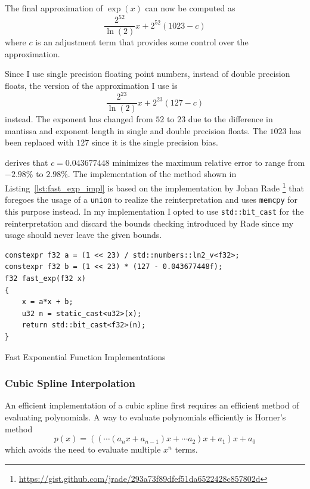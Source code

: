 \documentclass[a4paper, 11pt]{memoir}
\begin{document}
    The final approximation of $\exp{(x)}$ can now be computed as
    \begin{equation}
        \frac{2^{52}}{\ln{(2)}} x + 2^{52}(1023 - c)
    \end{equation}
    where $c$ is an adjustment term that provides some control over the approximation.

    Since I use single precision floating point numbers, instead of double precision floats, the version of the
    approximation I use is
    \begin{equation}
        \frac{2^{23}}{\ln{(2)}}x + 2^{23}(127 - c)
    \end{equation}
    instead. The exponent has changed from $52$ to $23$ due to the difference in mantissa and exponent length in single and
    double precision floats. The $1023$ has been replaced with $127$ since it is the single precision bias.

    \citeauthor{fast_exp} derives that $c = 0.043677448$ minimizes the maximum relative error to range from $-2.98\%$ to
    $2.98\%$. The implementation of the method shown in Listing~\ref{lst:fast_exp_impl} is based on the implementation
    by Johan Rade \footnote{\href{https://gist.github.com/jrade/293a73f89dfef51da6522428c857802d}{https://gist.github.com/jrade/293a73f89dfef51da6522428c857802d}}
    that foregoes the usage of a \texttt{union} to realize the reinterpretation and uses \texttt{memcpy}
    for this purpose instead. In my implementation I opted to use \texttt{std::bit_cast} for the reinterpretation
    and discard the bounds checking introduced by Rade since my usage should never leave the given bounds.

    \begin{listing}[t]
        \begin{verbatim}
constexpr f32 a = (1 << 23) / std::numbers::ln2_v<f32>;
constexpr f32 b = (1 << 23) * (127 - 0.043677448f);
f32 fast_exp(f32 x)
{
    x = a*x + b;
    u32 n = static_cast<u32>(x);
    return std::bit_cast<f32>(n);
}
        \end{verbatim}
        \caption{Fast Exponential Function Implementations}
        \label{lst:fast_exp_impl}
    \end{listing}
    
    \subsubsection{Cubic Spline Interpolation}
    \label{sec:impl_cubic_spline}
    An efficient implementation of a cubic spline first requires an efficient method of evaluating polynomials. A way to
    evaluate polynomials efficiently is Horner's method
    \begin{equation}
        p(x) = \left(\left(\cdots\left(a_nx + a_{n-1}\right)x + \cdots a_2\right)x + a_1\right)x + a_0
        \label{eq:horners_method}
    \end{equation}
    which avoids the need to evaluate multiple $x^n$ terms.
\end{document}
